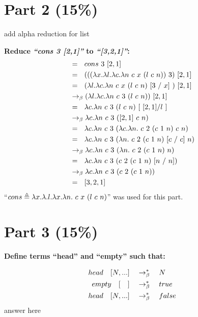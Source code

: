 \documentclass{article}
\begin{document}
	
		
	\section{Part 2 (15\%)}
	
	add alpha reduction for list
	
	\begin{Large}
		\textbf{Reduce \textit{``cons 3 [2,1]''} to \textit{``[3,2,1]''}:}
		\begin{align*}
			&= \saq cons \ 3 \ [2,1]  \\
			&= \saq (((\la x.\la l.\la c.\la n \ c \ x \ (l \ c \ n))\ 3) \ [2,1] \\
			&= \saq (\la l.\la c.\la n \ c \ x \ (l \ c \ n) \ [3 \ / \ x] \ ) \ [2,1] \\
			&\equals (\la l.\la c.\la n \ c \ 3 \ (l \ c \ n)) \ [2,1] \\
			&= \saq \la c.\la n \ c \ 3 \ (l \ c \ n) \ [ \ [2,1] / l \ ] \\
			&\equals \la c.\la n \ c \ 3 \ ([2,1] \ c \ n) \\
			&= \saq \la c.\la n \ c \ 3 \ (\la c.\la n. \ c \ 2 \ (c \ 1 \ n) \ c \ n) \\
			&= \saq \la c.\la n \ c \ 3 \ (\la n. \ c \ 2 \ (c \ 1 \ n) \ [c \ / \ c] \ n) \\
			&\equals \la c.\la n \ c \ 3 \ (\la n. \ c \ 2 \ (c \ 1 \ n) \ n) \\
			&= \saq \la c.\la n \ c \ 3 \ ( c \ 2 \ (c \ 1 \ n) \ [n \ / \ n]) \\
			&\equals \la c.\la n \ c \ 3 \ ( c \ 2 \ (c \ 1 \ n)) \\
			&= \saq [3,2,1]
		\end{align*}
		``$cons \triangleq \lambda x.\lambda .l.\lambda x.\lambda n. \ c \ x \ (l \ c \ n)$'' was used for this part.
	\end{Large}
	\newpage
	
	
	
	\section{Part 3 (15\%)}
	\textbf{Define terms ``head'' and ``empty'' such that:}
	
	\begin{Large}
		\begin{align*}
			head \quad [ N, ...] &\quad \rightarrow_\beta^*\quad  N\\
			empty \quad [\quad] &\quad \rightarrow_\beta^*\quad true\\
			head \quad [ N, ...] &\quad \rightarrow_\beta^*\quad false
		\end{align*}
		answer here
	\end{Large}
	\newpage
\end{document}
